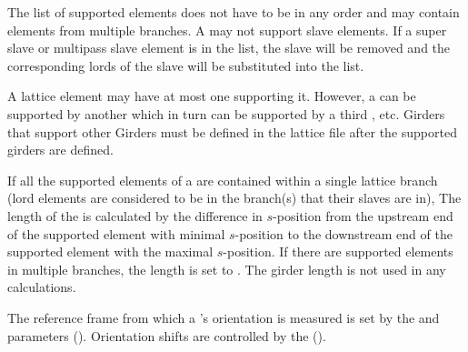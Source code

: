 The list of supported elements does not have to be in any order and may contain elements from
multiple branches. A  may not support slave elements.
If a super slave or multipass slave element is in the list, the slave will
be removed and the corresponding lords of the slave will be substituted into the list.

A lattice element may have at most one  supporting it. However, a  can be
supported by another  which in turn can be supported by a third , etc. Girders
that support other Girders must be defined in the lattice file after the supported girders are
defined.

If all the supported elements of a  are contained within a single lattice branch
(lord elements are considered to be in the branch(s) that their slaves are in), The length 
of the  is calculated by the difference in $s$-position from the upstream end of the
supported element with minimal $s$-position to the downstream end of the supported element with
the maximal $s$-position. If there are supported elements in multiple branches, the length is
set to . The girder length is not used in any calculations.

The reference frame from which a 's orientation is measured is set by the
 and  parameters ().
Orientation shifts are controlled by the  ().

